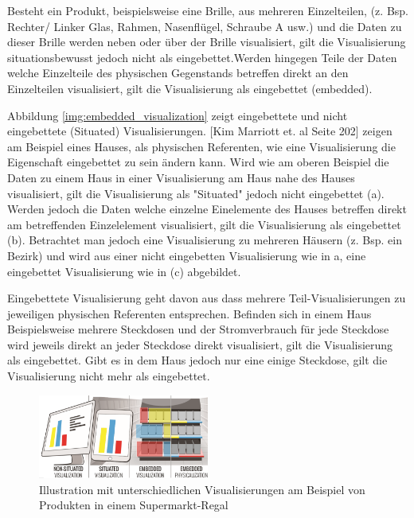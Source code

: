 Besteht ein Produkt, beispielsweise eine Brille, aus mehreren Einzelteilen, (z. Bsp. Rechter/ Linker Glas, Rahmen, Nasenflügel, Schraube A usw.) und die Daten zu dieser Brille werden neben oder über der Brille visualisiert, gilt die Visualisierung situationsbewusst jedoch nicht als eingebettet.Werden hingegen Teile der Daten welche Einzelteile des physischen Gegenstands betreffen direkt an den Einzelteilen visualisiert, gilt die Visualisierung als eingebettet (embedded).

Abbildung \ref{img:embedded_visualization} zeigt eingebettete und nicht eingebettete (Situated) Visualisierungen. [Kim Marriott et. al Seite 202] zeigen am Beispiel eines Hauses, als physischen Referenten, wie eine Visualisierung die Eigenschaft eingebettet zu sein ändern kann. Wird wie am oberen Beispiel die Daten zu einem Haus in einer Visualisierung am Haus nahe des Hauses visualisiert, gilt die Visualisierung als "Situated" jedoch nicht eingebettet (a). Werden jedoch die Daten welche einzelne Einelemente des Hauses betreffen direkt am betreffenden Einzelelement visualisiert, gilt die Visualisierung als eingebettet (b). Betrachtet man jedoch eine Visualisierung zu mehreren Häusern (z. Bsp. ein Bezirk) und wird aus einer nicht eingebetten Visualisierung wie in a, eine eingebettet Visualisierung wie in (c) abgebildet. 

Eingebettete Visualisierung geht davon aus dass mehrere Teil-Visualisierungen zu jeweiligen physischen Referenten entsprechen. Befinden sich in einem Haus Beispielsweise mehrere Steckdosen und der Stromverbrauch 
für jede Steckdose wird jeweils direkt an jeder Steckdose direkt visualisiert, gilt die Visualisierung als eingebettet. Gibt es in dem Haus jedoch nur eine einige Steckdose, gilt die Visualisierung nicht mehr als
eingebettet.

\vspace{15mm} 
\begin{figure}[H]
	\centering
	\includegraphics[width=0.5\textwidth]{resources/fundamentals/situated_visualization/Illustration_situated_embedded_visualization.png}
	\caption{Illustration mit unterschiedlichen Visualisierungen am Beispiel von Produkten in einem Supermarkt-Regal \cite{Illustration Visualisierungen}}
	\label{img:Illustration_situated_embedded_visualization}
\end{figure}

